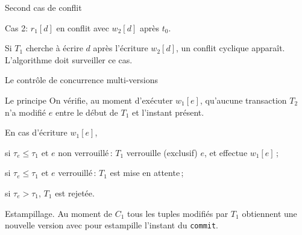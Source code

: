 \begin{frame}{Second cas  de conflit}


Cas 2: $r_1[d]$  en conflit avec $w_2[d]$ 
   \alert{après} $t_0$.
   
\vfill


\vfill
\begin{blocgauche}
 Si $T_1$ cherche
à écrire $d$ après l'écriture $w_2[d]$, un conflit
cyclique apparaît. \alert{L'algorithme doit surveiller ce cas.}
\end{blocgauche}

\end{frame}

\begin{frame}{Le contrôle de concurrence multi-versions}

\begin{defblock}{Le principe}
On vérifie, au moment d'exécuter $w_1[e]$,  qu'aucune
transaction $T_2$ n'a modifié $e$ entre le début de $T_1$ et l'instant
présent.
\end{defblock}
\vfill

En cas d'écriture $w_1[e]$, 
\begin{redbullet}
   \item si $\tau_e \leq \tau_1$ et $e$ non verrouillé\,: 
          $T_1$ verrouille (exclusif) $e$, et effectue  $w_1[e]$\,;
  \item
    si $\tau_e \leq \tau_1$ et $e$ verrouillé\,:           $T_1$ est mise en attente\,;
  \item    si $\tau_e > \tau_1$, $T_1$ est rejetée.
\end{redbullet}

\vfill

\begin{blocgauche}
\alert{Estampillage}. Au moment de $C_1$ 
   tous les tuples modifiés par $T_1$ obtiennent 
   une nouvelle version avec pour estampille l'instant du
   \texttt{commit}.
\end{blocgauche}

\end{frame}


